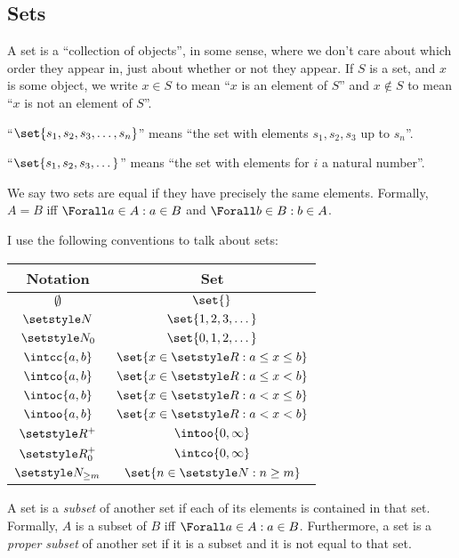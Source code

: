 \subsection*{Sets}

A set is a ``collection of objects'', in some sense, where we don't care about
which order they appear in, just about whether or not they appear. If \(S\) is a
set, and \(x\) is some object, we write \(x \in S\) to mean ``\(x\) is an
element of \(S\)'' and \(x \notin S\) to mean ``\(x\) is not an element of
\(S\)''.

``\(\set{s_1, s_2, s_3, \dotsc, s_n}\)'' means ``the set with elements
\(s_1, s_2, s_3\) up to \(s_n\)''.

``\(\set{s_1, s_2, s_3, \dotsc}\)'' means ``the set with elements for \(i\) a
natural number''.

We say two sets are equal if they have precisely the same elements. Formally,
\(A = B\) iff \(\Forall a \in A: a \in B\) and \(\Forall b \in B: b \in A\).

I use the following conventions to talk about sets:
\begin{center}
 \begin{tabular}{cc}
  \toprule
  \bfseries Notation & \bfseries Set \\
  \midrule
  \(\emptyset\) & \(\set{}\) \\
  \(\Naturals\)
  & \(\set{1, 2, 3, \dotsc}\) \\
  \(\Naturals_0\)
  & \(\set{0, 1, 2, \dotsc}\) \\
  \(\intcc{a, b}\) & \(\set{x \in \Reals : a \le x \le b}\) \\
  \(\intco{a, b}\) & \(\set{x \in \Reals : a \le x < b}\) \\
  \(\intoc{a, b}\) & \(\set{x \in \Reals : a < x \le b}\) \\
  \(\intoo{a, b}\) & \(\set{x \in \Reals : a < x < b}\) \\
  \(\Reals^+\) & \(\intoo{0, \infty}\) \\
  \(\Reals_0^+\) & \(\intco{0, \infty}\) \\
  \(\Naturals_{\ge m}\) & \(\set{n \in \Naturals : n \ge m}\) \\
  \bottomrule
 \end{tabular}
\end{center}
A set is a \emph{subset} of another set if each of its elements is contained in
that set. Formally, \(A\) is a subset of \(B\) iff \(\Forall a \in A : a \in
B\). Furthermore, a set is a \emph{proper subset} of another set if it is a
subset and it is not equal to that set.

